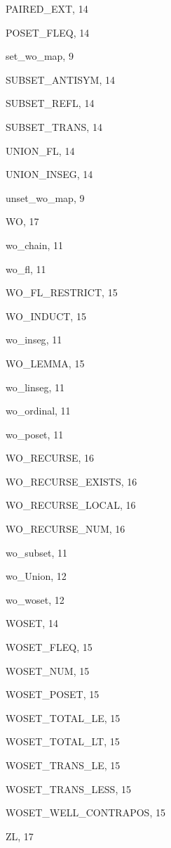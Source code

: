 \begin{theindex}
  \indexspace

  \item {\ptt PAIRED\_EXT}, 14
  \item {\ptt POSET\_FLEQ}, 14

  \indexspace

  \item {\ptt set\_wo\_map}, 9
  \item {\ptt SUBSET\_ANTISYM}, 14
  \item {\ptt SUBSET\_REFL}, 14
  \item {\ptt SUBSET\_TRANS}, 14

  \indexspace

  \item {\ptt UNION\_FL}, 14
  \item {\ptt UNION\_INSEG}, 14
  \item {\ptt unset\_wo\_map}, 9

  \indexspace

  \item {\ptt WO}, 17
  \item {\ptt wo\_chain}, 11
  \item {\ptt wo\_fl}, 11
  \item {\ptt WO\_FL\_RESTRICT}, 15
  \item {\ptt WO\_INDUCT}, 15
  \item {\ptt wo\_inseg}, 11
  \item {\ptt WO\_LEMMA}, 15
  \item {\ptt wo\_linseg}, 11
  \item {\ptt wo\_ordinal}, 11
  \item {\ptt wo\_poset}, 11
  \item {\ptt WO\_RECURSE}, 16
  \item {\ptt WO\_RECURSE\_EXISTS}, 16
  \item {\ptt WO\_RECURSE\_LOCAL}, 16
  \item {\ptt WO\_RECURSE\_NUM}, 16
  \item {\ptt wo\_subset}, 11
  \item {\ptt wo\_Union}, 12
  \item {\ptt wo\_woset}, 12
  \item {\ptt WOSET}, 14
  \item {\ptt WOSET\_FLEQ}, 15
  \item {\ptt WOSET\_NUM}, 15
  \item {\ptt WOSET\_POSET}, 15
  \item {\ptt WOSET\_TOTAL\_LE}, 15
  \item {\ptt WOSET\_TOTAL\_LT}, 15
  \item {\ptt WOSET\_TRANS\_LE}, 15
  \item {\ptt WOSET\_TRANS\_LESS}, 15
  \item {\ptt WOSET\_WELL\_CONTRAPOS}, 15

  \indexspace

  \item {\ptt ZL}, 17

\end{theindex}

